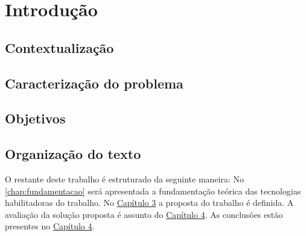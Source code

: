 \chapter{Introdução}

\section{Contextualização}

\Blindtext[2]

\section{Caracterização do problema}

\Blindtext[2]

\section{Objetivos}

\Blindtext[2]

\section{Organização do texto}

O restante deste trabalho é estruturado da seguinte maneira: No \autoref{chap:fundamentacao} será apresentada a fundamentação teórica das tecnologias habilitadoras do trabalho. No \underline{Capítulo 3} a proposta do trabalho é definida. A avaliação da solução proposta é assunto do \underline{Capítulo 4}. As conclusões estão presentes no \underline{Capítulo 4}.

